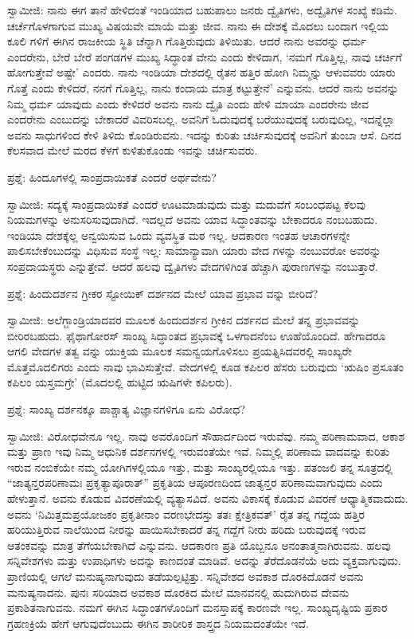 ಸ್ವಾಮೀಜಿ: ನಾನು ಈಗ ತಾನೆ ಹೇಳಿದಂತೆ ಇಂಡಿಯಾದ ಬಹುಪಾಲು ಜನರು ದ್ವೈತಿಗಳು, ಅದ್ವೈತಿಗಳ ಸಂಖ್ಯೆ ಕಡಿಮೆ. ಚರ್ಚೆಗೊಳಗಾಗುವ ಮುಖ್ಯ ವಿಷಯವೇ ಮಾಯೆ ಮತ್ತು ಜೀವ. ನಾನು ಈ ದೇಶಕ್ಕೆ ಮೊದಲು ಬಂದಾಗ ಇಲ್ಲಿಯ ಕೂಲಿ ಗಳಿಗೆ ಈಗಿನ ರಾಜಕೀಯ ಸ್ಥಿತಿ ಚೆನ್ನಾಗಿ ಗೊತ್ತಿರುವುದು ತಿಳಿಯಿತು. ಆದರೆ ನಾನು ಅವರನ್ನು ಧರ್ಮ ಎಂದರೇನು, ಬೇರೆ ಬೇರೆ ಪಂಗಡಗಳ ಮುಖ್ಯ ಸಿದ್ಧಾಂತ ವೇನು ಎಂದು ಕೇಳಿದಾಗ, ‘ನಮಗೆ ಗೊತ್ತಿಲ್ಲ, ನಾವು ಚರ್ಚಿಗೆ ಹೋಗುತ್ತೇವೆ ಅಷ್ಟೇ’ ಎಂದರು. ನಾನು ಇಂಡಿಯಾ ದೇಶದಲ್ಲಿ ರೈತನ ಹತ್ತಿರ ಹೋಗಿ ನಿಮ್ಮನ್ನು ಆಳುವವರು ಯಾರು ಗೊತ್ತೆ ಎಂದು ಕೇಳಿದರೆ, ನನಗೆ ಗೊತ್ತಿಲ್ಲ, ನಾನು ಕಂದಾಯ ಮಾತ್ರ ಕಟ್ಟುತ್ತೇನೆ’ ಎನ್ನುವನು. ಆದರೆ ನಾನು ಅವನನ್ನು ನಿಮ್ಮ ಧರ್ಮ ಯಾವುದು ಎಂದು ಕೇಳಿದರೆ ಅವನು ನಾನು ದ್ವೈತಿ ಎಂದು ಹೇಳಿ ಮಾಯಾ ಎಂದರೇನು ಜೀವ ಎಂದರೇನು ಎಂಬುದನ್ನು ಬೇಕಾದರೆ ವಿವರಿಸಬಲ್ಲ. ಅವನಿಗೆ ಓದುವುದಕ್ಕೆ ಬರೆಯುವುದಕ್ಕೆ ಬರುವುದಿಲ್ಲ, ಇದನ್ನೆಲ್ಲಾ ಅವನು ಸಾಧುಗಳಿಂದ ಕೇಳಿ ತಿಳಿದು ಕೊಂಡಿರುವನು. ಇದನ್ನು ಕುರಿತು ಚರ್ಚಿಸುವುದಕ್ಕೆ ಅವನಿಗೆ ತುಂಬಾ ಆಸೆ. ದಿನದ ಕೆಲಸವಾದ ಮೇಲೆ ಮರದ ಕೆಳಗೆ ಕುಳಿತುಕೊಂಡು ಇವನ್ನು ಚರ್ಚಿಸುವರು.

ಪ್ರಶ್ನೆ: ಹಿಂದೂಗಳಲ್ಲಿ ಸಾಂಪ್ರದಾಯಿಕತೆ ಎಂದರೆ ಅರ್ಥವೇನು?

ಸ್ವಾಮೀಜಿ: ಸದ್ಯಕ್ಕೆ ಸಾಂಪ್ರದಾಯಿಕತೆ ಎಂದರೆ ಊಟಮಾಡುವುದು ಮತ್ತು ಮದುವೆಗೆ ಸಂಬಂಧಪಟ್ಟ ಕೆಲವು ನಿಯಮಗಳನ್ನು ಅನುಸರಿಸುವುದಾಗಿದೆ. ಇದಲ್ಲದೆ ಅವನು ಯಾವ ಸಿದ್ಧಾಂತವನ್ನು ಬೇಕಾದರೂ ನಂಬಬಹುದು. ಇಂಡಿಯಾ ದೇಶಕ್ಕೆಲ್ಲ ಅನ್ವಯಿಸುವ ಒಂದು ವ್ಯವಸ್ಥಿತ ಮಠ ಇಲ್ಲ. ಆದಕಾರಣ ಇಂತಹ ಆಚಾರಗಳನ್ನೇ ಪಾಲಿಸಬೇಕೆಂಬುದನ್ನು ವಿಧಿಸುವ ಸಂಸ್ಥೆ ಇಲ್ಲ: ಸಾಮಾನ್ಯಾವಾಗಿ ಯಾರು ವೇದ ಗಳನ್ನು ನಂಬುವರೋ ಅವರನ್ನು ಸಂಪ್ರದಾಯಸ್ಥರು ಎನ್ನುತ್ತೇವೆ. ಆದರೆ ಹಲವು ದ್ವೈತಿಗಳು ವೇದಗಳಿಗಿಂತ ಹೆಚ್ಚಾಗಿ ಪುರಾಣಗಳನ್ನು ನಂಬುತ್ತಾರೆ.

ಪ್ರಶ್ನೆ: ಹಿಂದುದರ್ಶನ ಗ್ರೀಕರ ಸ್ಟೋಯಿಕ್​ ದರ್ಶನದ ಮೇಲೆ ಯಾವ ಪ್ರಭಾವ ವನ್ನು ಬೀರಿದೆ?

ಸ್ವಾಮೀಜಿ: ಅಲೆಗ್ಜಾಂಡ್ರಿಯಾದವರ ಮೂಲಕ ಹಿಂದುದರ್ಶನ ಗ್ರೀಕಿನ ದರ್ಶನದ ಮೇಲೆ ತನ್ನ ಪ್ರಭಾವವನ್ನು ಬೀರಿರಬಹುದು. ಫೈಥಾಗೋರಸ್​ ಸಾಂಖ್ಯ ಸಿದ್ಧಾಂತದ ಪ್ರಭಾವಕ್ಕೆ ಒಳಗಾದನೆಂಬ ಊಹೆಯೊಂದಿದೆ. ಹೇಗಾದರೂ ಆಗಲಿ ವೇದಗಳ ತತ್ವ ವನ್ನು ಯುಕ್ತಿಯ ಮೂಲಕ ಸಮನ್ವಯಗೊಳಿಸಲು ಪ್ರಯತ್ನಿಸಿದವರಲ್ಲಿ ಸಾಂಖ್ಯರೇ ಮೊತ್ತಮೊದಲಿಗರು ಎಂದು ನಾವು ಭಾವಿಸುತ್ತೇವೆ. ವೇದಗಳಲ್ಲಿ ಕೂಡ ಕಪಿಲರ ಹೆಸರು ಬರುವುದು ‘ಋಷಿಂ ಪ್ರಸೂತಂ ಕಪಿಲಂ ಯಸ್ತಮಗ್ರೇ’ (ಮೊದಲಲ್ಲಿ ಹುಟ್ಟಿದ ಋಷಿಗಳೇ ಕಪಿಲರು).

ಪ್ರಶ್ನೆ: ಸಾಂಖ್ಯ ದರ್ಶನಕ್ಕೂ ಪಾಶ್ಚಾತ್ಯ ವಿಜ್ಞಾನಗಳಿಗೂ ಏನು ವಿರೋಧ?

ಸ್ವಾಮೀಜಿ: ವಿರೋಧವೇನೂ ಇಲ್ಲ. ನಾವು ಅವರೊಂದಿಗೆ ಸೌಹಾರ್ದದಿಂದ ಇರುವೆವು. ನಮ್ಮ ಪರಿಣಾಮವಾದ, ಆಕಾಶ ಮತ್ತು ಪ್ರಾಣ ಇವು ನಿಮ್ಮ ಆಧುನಿಕ ದರ್ಶನಗಳಲ್ಲಿ ಇರುವಂತೆಯೇ ಇವೆ. ನಿಮ್ಮಲ್ಲಿ ಪರಿಣಾಮ ವಾದವನ್ನು ಕುರಿತು ಇರುವ ನಂಬಿಕೆಯೇ ನಮ್ಮ ಯೋಗಿಗಳಲ್ಲಿಯೂ ಇತ್ತು, ಮತ್ತು ಸಾಂಖ್ಯರಲ್ಲಿಯೂ ಇತ್ತು. ಪತಂಜಲಿ ತನ್ನ ಸೂತ್ರದಲ್ಲಿ “ಜಾತ್ಯನ್ತರಪರಿಣಾಮಃ ಪ್ರಕೃತ್ಯಾಪೂರಾತ್​” ಪ್ರಕೃತಿಯ ಆಪೂರಣದಿಂದ ಜಾತ್ಯನ್ತರ ಪರಿಣಾಮವಾಗುವುದು ಎಂದು ಹೇಳುತ್ತಾನೆ. ಅವನು ಕೊಡುವ ವಿವರಣೆಯಲ್ಲಿ ವ್ಯತ್ಯಾಸವಿದೆ. ಅವನು ವಿಕಾಸಕ್ಕೆ ಕೊಡುವ ವಿವರಣೆ ಆಧ್ಯಾತ್ಮಿಕವಾದುದು. ಅವನು ‘ನಿಮಿತ್ತಮಪ್ರಯೋಜಕಂ ಪ್ರಕೃತೀನಾಂ ವರಣಭೇದಸ್ತು ತತಃ ಕ್ಷೇತ್ರಿಕವತ್​’ ರೈತ ತನ್ನ ಗದ್ದೆಯ ಹತ್ತಿರ ಹರಿಯುತ್ತಿರುವ ನಾಲೆಯಿಂದ ನೀರನ್ನು ಹಾಯಿಸಬೇಕಾದರೆ ತನ್ನ ಗದ್ದೆಗೆ ನೀರು ಹರಿದು ಬರುವುದಕ್ಕೆ ಇರುವ ಆತಂಕವನ್ನು ಮಾತ್ರ ತೆಗೆಯಬೇಕಾಗಿದೆ ಎನ್ನುವನು. ಆದಕಾರಣ ಪ್ರತಿ ಯೊಬ್ಬನೂ ಅನಂತಾತ್ಮನಾಗಿರುವನು. ಹಲವು ಸನ್ನಿವೇಶಗಳು ಮತ್ತು ಉಪಾಧಿಗಳು ಅದನ್ನು ಕಾಣದಂತೆ ಮಾಡಿವೆ. ಅದನ್ನು ತೆರೆದೊಡನೆಯೆ ಅದು ವ್ಯಕ್ತವಾಗುವುದು. ಪ್ರಾಣಿಯಲ್ಲಿ ಆಗಲೆ ಮನುಷ್ಯನಾಗುವುದು ತಡೆಯಲ್ಪಟ್ಟಿತ್ತು. ಸನ್ನಿವೇಶದ ಅವಕಾಶ ದೊರಕಿದೊಡನೆ ಅವನು ಮನುಷ್ಯನಾದನು. ಪುನಃ ಸರಿಯಾದ ಅವಕಾಶ ದೊರಕಿದ ಮೇಲೆ ಮಾನವನಲ್ಲಿ ಹುದುಗಿರುವ ದೇವನು ಪ್ರಕಾಶಿತನಾಗುವನು. ನಮಗೆ ಈಗಿನ ಸಿದ್ಧಾಂತಗಳೊಂದಿಗೆ ಮನಸ್ತಾಪಕ್ಕೆ ಕಾರಣವೇ ಇಲ್ಲ. ಸಾಂಖ್ಯದೃಷ್ಟಿಯ ಪ್ರಕಾರ ಗ್ರಹಣಕ್ರಿಯೆ ಹೇಗೆ ಆಗುವುದೆಂಬುದು ಈಗಿನ ಶಾರೀರಿಕ ಶಾಸ್ತ್ರದ ನಿಯಮದಂತೆಯೇ ಇದೆ.


